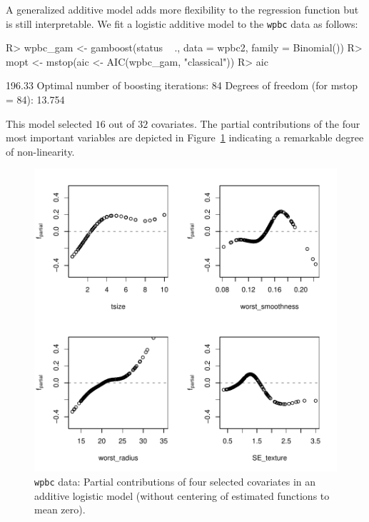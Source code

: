 \documentclass{article}
\newcommand{\Robject}[1]{\texttt{#1}}
\newenvironment{Schunk}{}{}
\begin{document}

A generalized additive model adds more flexibility to the regression function but is still
interpretable. We fit a logistic additive model to the \Robject{wpbc} data as follows:
\begin{Schunk}
\begin{Sinput}
R> wpbc_gam <- gamboost(status ~ ., data = wpbc2, 
         family = Binomial())
R> mopt <- mstop(aic <- AIC(wpbc_gam, "classical"))
R> aic
\end{Sinput}
\begin{Soutput}
[1] 196.33
Optimal number of boosting iterations: 84 
Degrees of freedom (for mstop = 84): 13.754 
\end{Soutput}
\end{Schunk}
This model selected $16$ out of $32$
covariates. The partial contributions of the four most important variables
are depicted in  
Figure~\ref{wpbc-gamboost-plot} indicating a remarkable degree of non-linearity.
\begin{figure}[t]
\begin{center}
\includegraphics{figures/BH-wpbc-gamboost-plot}
\caption{\Robject{wpbc} data: Partial contributions of four selected 
    covariates in an additive logistic model (without centering of
    estimated functions to mean zero).
    \label{wpbc-gamboost-plot}}
\end{center}
\end{figure}
\end{document}
